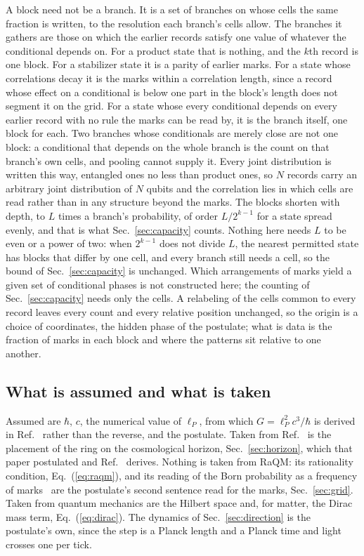 \documentclass[aps,prd,twocolumn,superscriptaddress,nofootinbib]{revtex4-2}
\begin{document}
A block need not be a branch. It is a set of branches on whose cells the same fraction is written, to the resolution each branch's cells allow. The branches it gathers are those on which the earlier records satisfy one value of whatever the conditional depends on. For a product state that is nothing, and the $k$th record is one block. For a stabilizer state it is a parity of earlier marks. For a state whose correlations decay it is the marks within a correlation length, since a record whose effect on a conditional is below one part in the block's length does not segment it on the grid. For a state whose every conditional depends on every earlier record with no rule the marks can be read by, it is the branch itself, one block for each. Two branches whose conditionals are merely close are not one block: a conditional that depends on the whole branch is the count on that branch's own cells, and pooling cannot supply it. Every joint distribution is written this way, entangled ones no less than product ones, so $N$ records carry an arbitrary joint distribution of $N$ qubits and the correlation lies in which cells are read rather than in any structure beyond the marks. The blocks shorten with depth, to $L$ times a branch's probability, of order $L/2^{k-1}$ for a state spread evenly, and that is what Sec.~\ref{sec:capacity} counts. Nothing here needs $L$ to be even or a power of two: when $2^{k-1}$ does not divide $L$, the nearest permitted state has blocks that differ by one cell, and every branch still needs a cell, so the bound of Sec.~\ref{sec:capacity} is unchanged. Which arrangements of marks yield a given set of conditional phases is not constructed here; the counting of Sec.~\ref{sec:capacity} needs only the cells. A relabeling of the cells common to every record leaves every count and every relative position unchanged, so the origin is a choice of coordinates, the hidden phase of the postulate; what is data is the fraction of marks in each block and where the patterns sit relative to one another.

\subsection{What is assumed and what is taken}
\label{sec:provenance}

Assumed are $\hbar$, $c$, the numerical value of $\ell_P$, from which $G = \ell_P^2c^3/\hbar$ is derived in Ref.~\cite{korytko2026} rather than the reverse, and the postulate. Taken from Ref.~\cite{korytko2026} is the placement of the ring on the cosmological horizon, Sec.~\ref{sec:horizon}, which that paper postulated and Ref.~\cite{korytko2026d} derives. Nothing is taken from RaQM: its rationality condition, Eq.~(\ref{eq:raqm}), and its reading of the Born probability as a frequency of marks~\cite{palmer2026} are the postulate's second sentence read for the marks, Sec.~\ref{sec:grid}. Taken from quantum mechanics are the Hilbert space and, for matter, the Dirac mass term, Eq.~(\ref{eq:dirac}). The dynamics of Sec.~\ref{sec:direction} is the postulate's own, since the step is a Planck length and a Planck time and light crosses one per tick.
\end{document}
